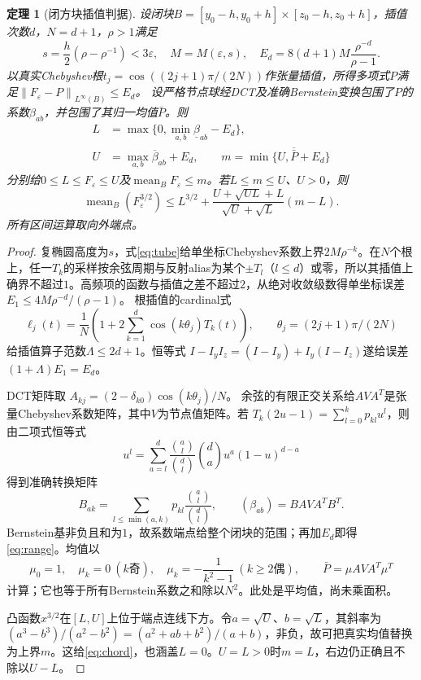 \documentclass[UTF8,11pt,a4paper,fontset=fandol]{ctexart}
\newtheorem{theorem}{定理}[section]
\theoremstyle{definition}\newtheorem{definition}[theorem]{定义}
\theoremstyle{remark}\newtheorem{remark}[theorem]{注}
\newcommand{\norm}[1]{\left\lVert#1\right\rVert}
\DeclareMathOperator{\mean}{mean}
\begin{document}
\begin{theorem}[闭方块插值判据]\label{thm:certificate}
设闭块$B=[y_0-h,y_0+h]\times[z_0-h,z_0+h]$，插值次数$d$，$N=d+1$，$\rho>1$满足
\[
 s=\frac h2(\rho-\rho^{-1})<3\varepsilon,
 \quad M=M(\varepsilon,s),\quad
 E_d=8(d+1)M\frac{\rho^{-d}}{\rho-1}.
\]
以真实Chebyshev根$t_j=\cos((2j+1)\pi/(2N))$作张量插值，所得多项式$P$满足$\norm{F_\varepsilon-P}_{L^\infty(B)}\le E_d$。
设严格节点球经DCT及准确Bernstein变换包围了$P$的系数$\beta_{ab}$，并包围了其归一均值$\bar P$。则
\begin{align}\label{eq:range}
 L&=\max\{0,\min_{a,b}\underline\beta_{ab}-E_d\},\\
 U&=\max_{a,b}\overline\beta_{ab}+E_d,
 \qquad m=\min\{U,\overline{\bar P}+E_d\}
\end{align}
分别给$0\le L\le F_\varepsilon\le U$及$\mean_BF_\varepsilon\le m$。若$L\le m\le U$、$U>0$，则
\begin{equation}\label{eq:chord}
 \mean_B(F_\varepsilon^{3/2})
 \le L^{3/2}+
 \frac{U+\sqrt{UL}+L}{\sqrt U+\sqrt L}(m-L).
\end{equation}
所有区间运算取向外端点。
\end{theorem}
\begin{proof}
复椭圆高度为$s$，式\eqref{eq:tube}给单坐标Chebyshev系数上界$2M\rho^{-k}$。在$N$个根上，任一$T_k$的采样按余弦周期与反射alias为某个$\pm T_l$（$l\le d$）或零，所以其插值上确界不超过$1$。高频项的函数与插值之差不超过$2$，从绝对收敛级数得单坐标误差
$E_1\le4M\rho^{-d}/(\rho-1)$。
根插值的cardinal式
\[
 \ell_j(t)=\frac1N\left(1+2\sum_{k=1}^d\cos(k\theta_j)T_k(t)\right),
 \qquad\theta_j=(2j+1)\pi/(2N)
\]
给插值算子范数$\Lambda\le2d+1$。恒等式
$I-I_yI_z=(I-I_y)+I_y(I-I_z)$遂给误差$(1+\Lambda)E_1=E_d$。

DCT矩阵取
$A_{kj}=(2-\delta_{k0})\cos(k\theta_j)/N$。
余弦的有限正交关系给$AVA^T$是张量Chebyshev系数矩阵，其中$V$为节点值矩阵。若
$T_k(2u-1)=\sum_{l=0}^kp_{kl}u^l$，则由二项式恒等式
\[
 u^l=\sum_{a=l}^d\frac{\binom al}{\binom dl}
 \binom da u^a(1-u)^{d-a}
\]
得到准确转换矩阵
\begin{equation}\label{eq:Bernstein}
 B_{ak}=\sum_{l\le\min(a,k)}p_{kl}\frac{\binom al}{\binom dl},
 \qquad(\beta_{ab})=BAVA^TB^T.
\end{equation}
Bernstein基非负且和为$1$，故系数端点给整个闭块的范围；再加$E_d$即得\eqref{eq:range}。均值以
\begin{equation}\label{eq:mean}
 \mu_0=1,\quad \mu_k=0\ (k\text{奇}),\quad
 \mu_k=-\frac1{k^2-1}\ (k\ge2\text{偶}),\qquad
 \bar P=\mu AVA^T\mu^T
\end{equation}
计算；它也等于所有Bernstein系数之和除以$N^2$。此处是平均值，尚未乘面积。

凸函数$x^{3/2}$在$[L,U]$上位于端点连线下方。令$a=\sqrt U$、$b=\sqrt L$，其斜率为$(a^3-b^3)/(a^2-b^2)=(a^2+ab+b^2)/(a+b)$，非负，故可把真实均值替换为上界$m$。这给\eqref{eq:chord}，也涵盖$L=0$。$U=L>0$时$m=L$，右边仍正确且不除以$U-L$。
\end{proof}
\end{document}
